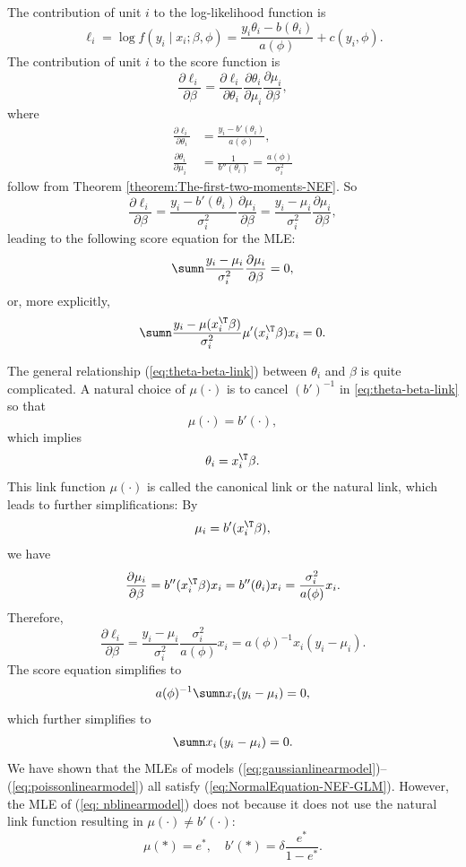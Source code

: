 The contribution of unit $i$ to the log-likelihood function is
\[
\ell_{i}=\log f(y_{i}\mid x_{i};\beta,\phi)=\frac{y_{i}\theta_{i}-b(\theta_{i})}{a(\phi)}+c(y_{i},\phi).
\]
The  contribution of unit $i$ to the score function is
\[
\frac{\partial\ell_{i}}{\partial\beta}=\frac{\partial\ell_{i}}{\partial\theta_{i}}\frac{\partial\theta_{i}}{\partial\mu_{i}}\frac{\partial\mu_{i}}{\partial\beta},
\]
where 
\begin{align*}
\frac{\partial\ell_{i}}{\partial\theta_{i}} & =\frac{y_{i}-b'(\theta_{i})}{a(\phi)},\\
\frac{\partial\theta_{i}}{\partial\mu_{i}} & =\frac{1}{b''(\theta_{i})}=\frac{a(\phi)}{\sigma_{i}^{2}}
\end{align*}
follow from Theorem \ref{theorem:The-first-two-moments-NEF}. 
So 
\[
\frac{\partial\ell_{i}}{\partial\beta}=\frac{y_{i}-b'(\theta_{i})}{\sigma_{i}^{2}}\frac{\partial\mu_{i}}{\partial\beta}=\frac{y_{i}-\mu_{i}}{\sigma_{i}^{2}}\frac{\partial\mu_{i}}{\partial\beta},
\]
leading to the following score equation for the MLE:
\begin{equation}
\sumn\frac{y_{i}-\mu_{i}}{\sigma_{i}^{2}}\frac{\partial\mu_{i}}{\partial\beta}=0,\label{eq:score-equation-mle-form1}
\end{equation}
or, more explicitly, 
\[
\sumn\frac{y_{i}-\mu (x_{i}^{\T}\beta) }{\sigma_{i}^{2}}\mu'(x_{i}^{\T}\beta)x_{i}=0 . 
\]

The general relationship (\ref{eq:theta-beta-link}) between $\theta_{i}$
and $\beta$ is quite complicated. A natural choice of $\mu(\cdot)$
is to cancel $(b')^{-1}$ in \eqref{eq:theta-beta-link} so that 
\[
\mu(\cdot)=b'(\cdot) ,
\]
which implies
\[
\theta_{i}=x_{i}^{\T}\beta.
\]
This link function $\mu(\cdot)$ is called the canonical link or the natural link, which leads
to further simplifications: By
\[ 
\mu_{i}  =b'(x_{i}^{\T}\beta),
\]
we have
\[
\frac{\partial\mu_{i}}{\partial\beta}=b''(x_{i}^{\T}\beta)x_{i}
= b''( \theta_i )x_{i}
=\frac{\sigma_{i}^{2}}{a(\phi)}x_{i}.
\] 
Therefore, 
\[
\frac{\partial\ell_{i}}{\partial\beta} = \frac{y_{i}-\mu_{i}}{\sigma_{i}^{2}}\frac{\sigma_{i}^{2}}{a(\phi)}x_{i} 
= a(\phi)^{-1} x_i (y_{i}-\mu_{i}) .
\]
The score equation simplifies to
\[ 
a(\phi)^{-1} \sumn  x_i (y_{i}-\mu_{i})    =0 ,
\]
which further simplifies to
\begin{eqnarray}
 \sumn x_{i}\left(y_{i}-\mu_{i}\right)=0.\label{eq:NormalEquation-NEF-GLM}
\end{eqnarray} 
We have shown that the MLEs of models (\ref{eq:gaussianlinearmodel})--(\ref{eq:poissonlinearmodel})
all satisfy (\ref{eq:NormalEquation-NEF-GLM}). However, the MLE of (\ref{eq: nblinearmodel})
does not because it does not use the natural link function resulting in $\mu(\cdot) \neq b'(\cdot) $: 
$$
\mu(*) = e^{*},\quad 
b'(*) = \delta \frac{e^*}{ 1 - e^*}. 
$$



